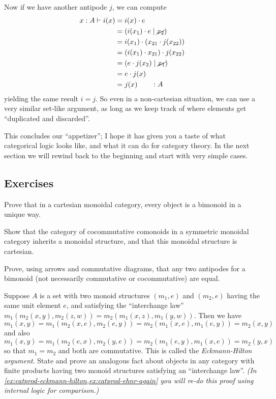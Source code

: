 Now if we have another antipode $j$, we can compute
\begin{align*}
  x:A \vdash i(x)
  &= i(x)\cdot e\\
  &= (i(x_1)\cdot e\mid\cancel{x_2})\\
  &= i(x_1)\cdot (x_{21} \cdot j(x_{22}))\\
  &= (i(x_1)\cdot x_{21}) \cdot j(x_{22})\\
  &= (e \cdot j(x_{2})\mid\cancel{x_1})\\
  &= e\cdot j(x)\\
  &= j(x) \qquad :A
\end{align*}
yielding the same result $i=j$.
So even in a non-cartesian situation, we can use a very similar set-like argument, as long as we keep track of where elements get ``duplicated and discarded''.

This concludes our ``appetizer''; I hope it has given you a taste of what categorical logic looks like, and what it can do for category theory.
In the next section we will rewind back to the beginning and start with very simple cases.

\subsection*{Exercises}

\begin{ex}\label{ex:cartmon-bimon-uniq}
  Prove that in a cartesian monoidal category, every object is a bimonoid in a unique way.
\end{ex}

\begin{ex}\label{ex:ccmon-cart}
  Show that the category of cocommutative comonoids in a symmetric monoidal category inherits a monoidal structure, and that this monoidal structure is cartesian.
\end{ex}

\begin{ex}\label{ex:antipode}
  Prove, using arrows and commutative diagrams, that any two antipodes for a bimonoid (not necessarily commutative or cocommutative) are equal.
\end{ex}

\begin{ex}\label{ex:eckmann-hilton}
  Suppose $A$ is a set with two monoid structures $(m_1,e)$ and $(m_2,e)$ having the same unit element $e$, and satisfying the ``interchange law'' $m_1(m_2(x,y),m_2(z,w)) = m_2(m_1(x,z),m_1(y,w))$.
  Then we have
  \[ m_1(x,y) = m_1(m_2(x,e),m_2(e,y)) = m_2(m_1(x,e),m_1(e,y)) = m_2(x,y) \]
  and also
  \[ m_1(x,y) = m_1(m_2(e,x),m_2(y,e)) = m_2(m_1(e,y),m_1(x,e)) = m_2(y,x) \]
  so that $m_1=m_2$ and both are commutative.
  This is called the \emph{Eckmann-Hilton argument}.
  State and prove an analogous fact about objects in any category with finite products having two monoid structures satisfying an ``interchange law''.
  \textit{(In \cref{ex:catprod-eckmann-hilton,ex:catprod-ehnr-again} you will re-do this proof using internal logic for comparison.)}
\end{ex}

